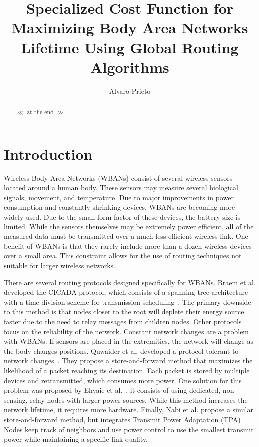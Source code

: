 \documentclass{article}
\begin{document}
\title{Specialized Cost Function for Maximizing Body Area Networks Lifetime Using Global Routing Algorithms}
\author{Alvaro Prieto}
\maketitle

\begin{abstract}
$\ll$ at the end $\gg$
\end{abstract}

\section{Introduction}
Wireless Body Area Networks (WBANs) consist of several wireless sensors located around a human body. These sensors may measure several biological signals, movement, and temperature. Due to major improvements in power consumption and constantly shrinking devices, WBANs are becoming more widely used. Due to the small form factor of these devices, the battery size is limited. While the sensors themselves may be extremely power efficient, all of the measured data must be transmitted over a much less efficient wireless link. One benefit of WBANs is that they rarely include more than a dozen wireless devices over a small area. This constraint allows for the use of routing techniques not suitable for larger wireless networks.

There are several routing protocols designed specifically for WBANs. Braem et al. developed the CICADA protocol, which consists of a spanning tree architecture with a time-division scheme for transmission scheduling~\cite{protocol:CICADA}. The primary downside to this method is that nodes closer to the root will deplete their energy source faster due to the need to relay messages from children nodes. Other protocols focus on the reliability of the network. Constant network changes are a problem with WBANs. If sensors are placed in the extremities, the network will change as the body changes positions. Quwaider et al. developed a protocol tolerant to network changes~\cite{routing:storeandforward}. They propose a store-and-forward method that maximizes the likelihood of a packet reaching its destination. Each packet is stored by multiple devices and retransmitted, which consumes more power. One solution for this problem was proposed by Ehyaie et al.~\cite{relay:networklife}, it consists of using dedicated, non-sensing, relay nodes with larger power sources. While this method increases the network lifetime, it requires more hardware. Finally, Nabi et al. propose a similar store-and-forward method, but integrates Transmit Power Adaptation (TPA)~\cite{relay:transmitpoweradaptation}. Nodes keep track of neighbors and use power control to use the smallest transmit power while maintaining a specific link quality.
\end{document}
